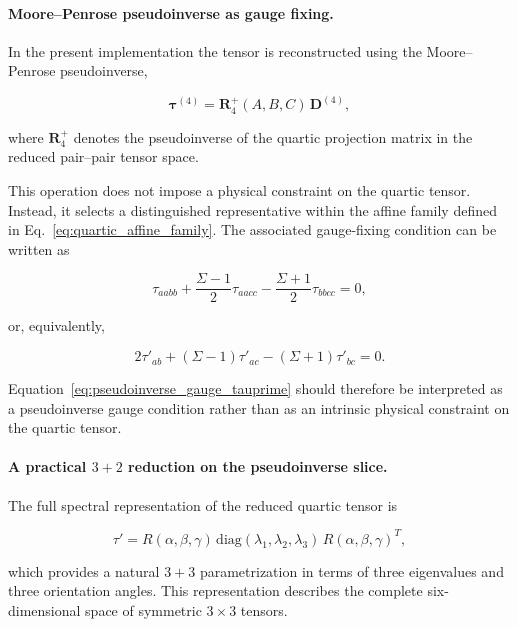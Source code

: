 \paragraph{Moore--Penrose pseudoinverse as gauge fixing.}

In the present implementation the tensor is reconstructed using the
Moore--Penrose pseudoinverse,

\begin{equation}
\boldsymbol\tau^{(4)}=
\mathbf R_4^{+}(A,B,C)\,\mathbf D^{(4)},
\label{eq:quartic_pseudoinverse}
\end{equation}

where $\mathbf R_4^{+}$ denotes the pseudoinverse of the quartic projection
matrix in the reduced pair--pair tensor space.

This operation does not impose a physical constraint on the quartic tensor.
Instead, it selects a distinguished representative within the affine family
defined in Eq.~\eqref{eq:quartic_affine_family}. The associated gauge-fixing
condition can be written as

\begin{equation}
\tau_{aabb}+\frac{\Sigma-1}{2}\tau_{aacc}
-\frac{\Sigma+1}{2}\tau_{bbcc}=0,
\label{eq:pseudoinverse_gauge_tau}
\end{equation}

or, equivalently,

\begin{equation}
2\tau'_{ab}+(\Sigma-1)\tau'_{ac}-(\Sigma+1)\tau'_{bc}=0.
\label{eq:pseudoinverse_gauge_tauprime}
\end{equation}

Equation~\eqref{eq:pseudoinverse_gauge_tauprime} should therefore be
interpreted as a pseudoinverse gauge condition rather than as an
intrinsic physical constraint on the quartic tensor.

\paragraph{A practical $3+2$ reduction on the pseudoinverse slice.}

The full spectral representation of the reduced quartic tensor is

\begin{equation}
\tau' = R(\alpha,\beta,\gamma)\,
\mathrm{diag}(\lambda_1,\lambda_2,\lambda_3)\,
R(\alpha,\beta,\gamma)^T,
\label{eq:tauprime_spectral_3plus3}
\end{equation}

which provides a natural $3+3$ parametrization in terms of three
eigenvalues and three orientation angles. This representation describes
the complete six-dimensional space of symmetric $3\times3$ tensors.


